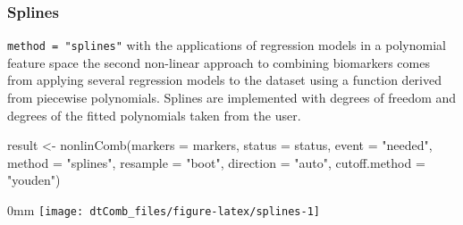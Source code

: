 \documentclass[]{article}
\newcommand{\hlstr}[1]{\textcolor[rgb]{0.251,0.627,0.251}{#1}}%
\newcommand{\hlstd}[1]{\textcolor[rgb]{0.251,0.251,0.251}{#1}}%
\newenvironment{Shaded}{\begin{myshaded}}{\end{myshaded}}
\newcommand{\StringTok}[1]{\hlstr{#1}}
\newcommand{\OtherTok}[1]{{#1}}
\newcommand{\FunctionTok}[1]{\hlstd{#1}}
\newcommand{\AttributeTok}[1]{{#1}}
\newcommand{\NormalTok}[1]{\hlstd{#1}}
\begin{document}
\hypertarget{splines}{%
\subsubsection{Splines}\label{splines}}

\texttt{method = "splines"} with the applications of regression models in a polynomial feature space the second non-linear approach to combining biomarkers comes from applying several regression models to the dataset using a function derived from piecewise polynomials. Splines are implemented with degrees of freedom and degrees of the fitted polynomials taken from the user.

\begin{Shaded}
\begin{Highlighting}[]
\NormalTok{result }\OtherTok{\textless{}{-}} \FunctionTok{nonlinComb}\NormalTok{(}\AttributeTok{markers =}\NormalTok{ markers, }
                  \AttributeTok{status =}\NormalTok{ status, }
                  \AttributeTok{event =} \StringTok{"needed"}\NormalTok{, }
                  \AttributeTok{method =} \StringTok{"splines"}\NormalTok{,}
                  \AttributeTok{resample =} \StringTok{"boot"}\NormalTok{,}
                  \AttributeTok{direction =} \StringTok{"auto"}\NormalTok{, }
                  \AttributeTok{cutoff.method =} \StringTok{"youden"}\NormalTok{)}
\end{Highlighting}
\end{Shaded}

\begin{adjustwidth}{\fltoffset}{0mm}
\texttt{[image: dtComb\_files/figure-latex/splines-1]} \end{adjustwidth}
\end{document}
